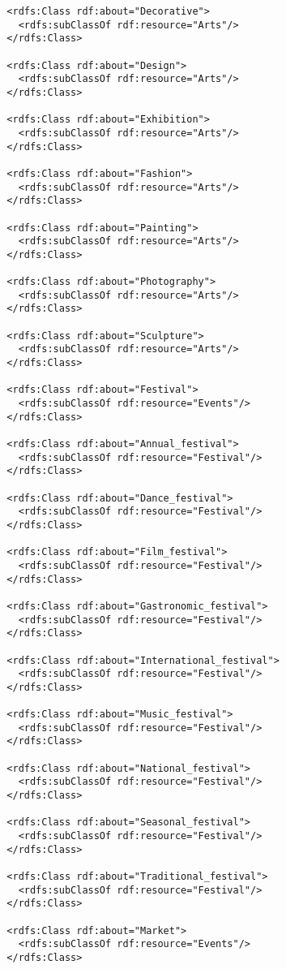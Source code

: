 \begin{verbatim}
  <rdfs:Class rdf:about="Decorative">
    <rdfs:subClassOf rdf:resource="Arts"/>
  </rdfs:Class>
			
  <rdfs:Class rdf:about="Design">
    <rdfs:subClassOf rdf:resource="Arts"/>
  </rdfs:Class>	

  <rdfs:Class rdf:about="Exhibition">
    <rdfs:subClassOf rdf:resource="Arts"/>
  </rdfs:Class>
  
  <rdfs:Class rdf:about="Fashion">
    <rdfs:subClassOf rdf:resource="Arts"/>
  </rdfs:Class>
  
  <rdfs:Class rdf:about="Painting">
    <rdfs:subClassOf rdf:resource="Arts"/>
  </rdfs:Class>
  
  <rdfs:Class rdf:about="Photography">
    <rdfs:subClassOf rdf:resource="Arts"/>
  </rdfs:Class>

  <rdfs:Class rdf:about="Sculpture">
    <rdfs:subClassOf rdf:resource="Arts"/>
  </rdfs:Class>
  
  <rdfs:Class rdf:about="Festival">
    <rdfs:subClassOf rdf:resource="Events"/>
  </rdfs:Class>
  
  <rdfs:Class rdf:about="Annual_festival">
    <rdfs:subClassOf rdf:resource="Festival"/>
  </rdfs:Class>
 
  <rdfs:Class rdf:about="Dance_festival">
    <rdfs:subClassOf rdf:resource="Festival"/>
  </rdfs:Class>
  			
  <rdfs:Class rdf:about="Film_festival">
    <rdfs:subClassOf rdf:resource="Festival"/>
  </rdfs:Class>		
  
  <rdfs:Class rdf:about="Gastronomic_festival">
    <rdfs:subClassOf rdf:resource="Festival"/>
  </rdfs:Class>
			
  <rdfs:Class rdf:about="International_festival">
    <rdfs:subClassOf rdf:resource="Festival"/>
  </rdfs:Class>
  
  <rdfs:Class rdf:about="Music_festival">
    <rdfs:subClassOf rdf:resource="Festival"/>
  </rdfs:Class>

  <rdfs:Class rdf:about="National_festival">
    <rdfs:subClassOf rdf:resource="Festival"/>
  </rdfs:Class>
			
  <rdfs:Class rdf:about="Seasonal_festival">
    <rdfs:subClassOf rdf:resource="Festival"/>
  </rdfs:Class>
			
  <rdfs:Class rdf:about="Traditional_festival">
    <rdfs:subClassOf rdf:resource="Festival"/>
  </rdfs:Class>
			
  <rdfs:Class rdf:about="Market">
    <rdfs:subClassOf rdf:resource="Events"/>
  </rdfs:Class>
  

\end{verbatim}
